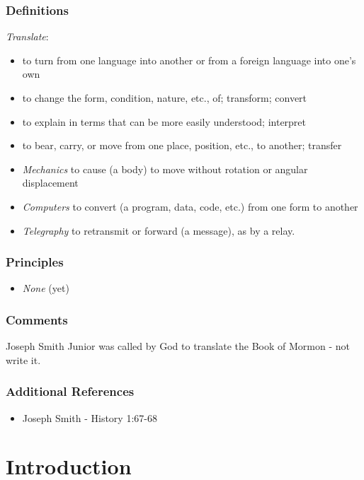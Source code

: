 \documentclass[12pt]{report}
\begin{document}
\subsection{Definitions\label{titlePage:DFN4}}
\emph{Translate}: \begin{itemize}
\item to turn from one language into another or from a foreign language into one's own
\item to change the form, condition, nature, etc., of; transform; convert
\item to explain in terms that can be more easily understood; interpret
\item to bear, carry, or move from one place, position, etc., to another; transfer
\item \emph{Mechanics} to cause (a body) to move without rotation or angular displacement
\item \emph{Computers} to convert (a program, data, code, etc.) from one form to another
\item \emph{Telegraphy} to retransmit or forward (a message), as by a relay.
\end{itemize}
\subsection{Principles\label{titlePage:principles4}}
\begin{itemize}
\item \emph{None} (yet)
\end{itemize}

\subsection{Comments\label{titlePage:comments4}}
Joseph Smith Junior was called by God to translate the Book of Mormon - not write it.  

\subsection{Additional References\label{titlePage:references4}}
\begin{itemize}
\item Joseph Smith - History 1:67-68
\end{itemize}

\chapter{Introduction}
\end{document}
